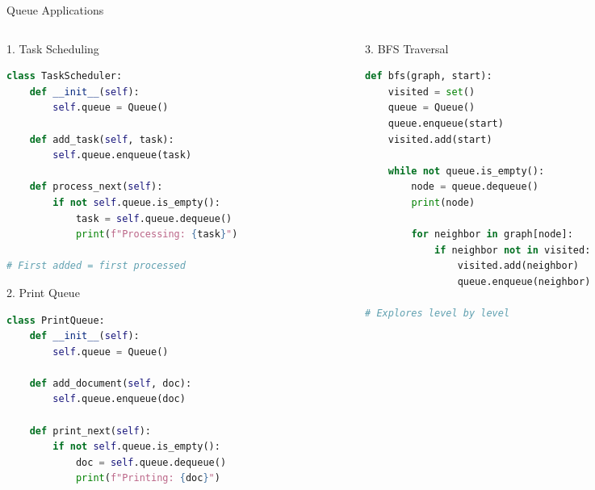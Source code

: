 \documentclass[aspectratio=169,xcolor=dvipsnames]{beamer}
\begin{document}
\begin{frame}[fragile]{Queue Applications}
  \begin{columns}
    \begin{column}{0.48\textwidth}
      \begin{exampleblock}{1. Task Scheduling}
        \begin{lstlisting}[language=Python,basicstyle=\tiny\ttfamily]
class TaskScheduler:
    def __init__(self):
        self.queue = Queue()

    def add_task(self, task):
        self.queue.enqueue(task)

    def process_next(self):
        if not self.queue.is_empty():
            task = self.queue.dequeue()
            print(f"Processing: {task}")

# First added = first processed
        \end{lstlisting}
      \end{exampleblock}

      \begin{exampleblock}{2. Print Queue}
        \begin{lstlisting}[language=Python,basicstyle=\tiny\ttfamily]
class PrintQueue:
    def __init__(self):
        self.queue = Queue()

    def add_document(self, doc):
        self.queue.enqueue(doc)

    def print_next(self):
        if not self.queue.is_empty():
            doc = self.queue.dequeue()
            print(f"Printing: {doc}")
        \end{lstlisting}
      \end{exampleblock}
    \end{column}
    \begin{column}{0.48\textwidth}
      \begin{exampleblock}{3. BFS Traversal}
        \begin{lstlisting}[language=Python,basicstyle=\tiny\ttfamily]
def bfs(graph, start):
    visited = set()
    queue = Queue()
    queue.enqueue(start)
    visited.add(start)

    while not queue.is_empty():
        node = queue.dequeue()
        print(node)

        for neighbor in graph[node]:
            if neighbor not in visited:
                visited.add(neighbor)
                queue.enqueue(neighbor)

# Explores level by level
        \end{lstlisting}
      \end{exampleblock}


\end{column}
\end{columns}
\end{frame}
\end{document}

